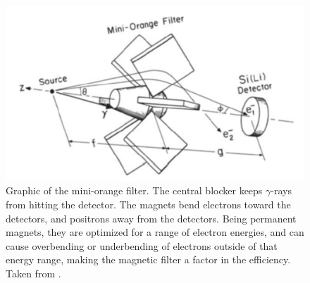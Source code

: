 \begin{figure}
    \centering
    \includegraphics[scale=0.6]{Setup_Figs/mini-orange-metlay-figure.pdf}
    \caption{Graphic of the mini-orange filter. The central blocker keeps $\gamma$-rays from hitting the detector. The magnets bend electrons toward the detectors, and positrons away from the detectors. Being permanent magnets, they are optimized for a range of electron energies, and can cause overbending or underbending of electrons outside of that energy range, making the magnetic filter a factor in the efficiency. Taken from \citep{metlay93:_iceball_comm}.}
    \label{fig:mini_orange}
\end{figure}